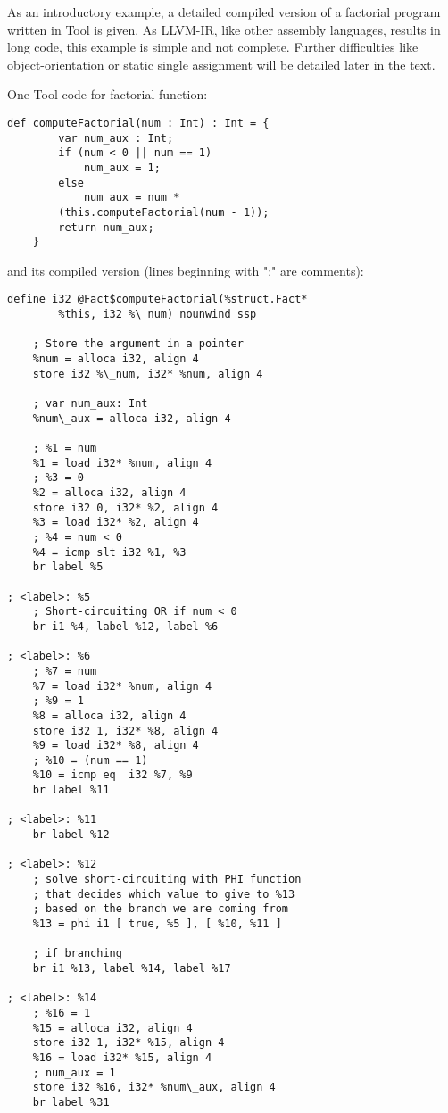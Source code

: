 As an introductory example, a detailed compiled version of a factorial program written in Tool is given. As LLVM-IR, like other assembly languages, results in long code, this example is simple and not complete. Further difficulties like object-orientation or static single assignment will be detailed later in the text.

One Tool code for factorial function:
\begin{lstlisting}
def computeFactorial(num : Int) : Int = {
        var num_aux : Int;
        if (num < 0 || num == 1)
            num_aux = 1;
        else
            num_aux = num * 
		(this.computeFactorial(num - 1));
        return num_aux;
    }
\end{lstlisting}
and its compiled version (lines beginning with ";" are comments):
\begin{verbatim}
define i32 @Fact$computeFactorial(%struct.Fact* 
        %this, i32 %\_num) nounwind ssp
    
    ; Store the argument in a pointer
    %num = alloca i32, align 4
    store i32 %\_num, i32* %num, align 4

    ; var num_aux: Int
    %num\_aux = alloca i32, align 4

    ; %1 = num
    %1 = load i32* %num, align 4
    ; %3 = 0
    %2 = alloca i32, align 4
    store i32 0, i32* %2, align 4
    %3 = load i32* %2, align 4
    ; %4 = num < 0
    %4 = icmp slt i32 %1, %3
    br label %5
    
; <label>: %5
    ; Short-circuiting OR if num < 0
    br i1 %4, label %12, label %6
    
; <label>: %6
    ; %7 = num
    %7 = load i32* %num, align 4
    ; %9 = 1
    %8 = alloca i32, align 4
    store i32 1, i32* %8, align 4
    %9 = load i32* %8, align 4
    ; %10 = (num == 1)
    %10 = icmp eq  i32 %7, %9
    br label %11
    
; <label>: %11
    br label %12
    
; <label>: %12
    ; solve short-circuiting with PHI function
    ; that decides which value to give to %13
    ; based on the branch we are coming from
    %13 = phi i1 [ true, %5 ], [ %10, %11 ]

    ; if branching
    br i1 %13, label %14, label %17
    
; <label>: %14
    ; %16 = 1
    %15 = alloca i32, align 4
    store i32 1, i32* %15, align 4
    %16 = load i32* %15, align 4
    ; num_aux = 1
    store i32 %16, i32* %num\_aux, align 4
    br label %31
    

\end{verbatim}

